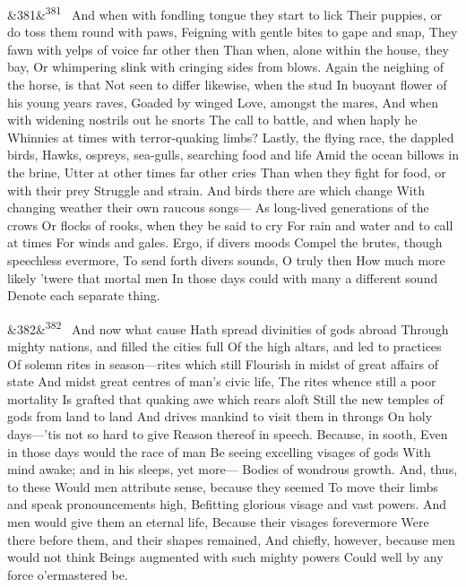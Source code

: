 \documentclass[12pt]{article}
\newcommand{\para}[1][]{\par\noindent\ifx&#1&\else\textsuperscript{\footnotesize #1}~\fi}
\begin{document}
\para[381] And when with fondling tongue they start to lick Their puppies, or do toss them round with paws, Feigning with gentle bites to gape and snap, They fawn with yelps of voice far other then Than when, alone within the house, they bay, Or whimpering slink with cringing sides from blows. Again the neighing of the horse, is that Not seen to differ likewise, when the stud In buoyant flower of his young years raves, Goaded by winged Love, amongst the mares, And when with widening nostrils out he snorts The call to battle, and when haply he Whinnies at times with terror-quaking limbs? Lastly, the flying race, the dappled birds, Hawks, ospreys, sea-gulls, searching food and life Amid the ocean billows in the brine, Utter at other times far other cries Than when they fight for food, or with their prey Struggle and strain. And birds there are which change With changing weather their own raucous songs--- As long-lived generations of the crows Or flocks of rooks, when they be said to cry For rain and water and to call at times For winds and gales. Ergo, if divers moods Compel the brutes, though speechless evermore, To send forth divers sounds, O truly then How much more likely 'twere that mortal men In those days could with many a different sound Denote each separate thing.

\para[382] And now what cause Hath spread divinities of gods abroad Through mighty nations, and filled the cities full Of the high altars, and led to practices Of solemn rites in season---rites which still Flourish in midst of great affairs of state And midst great centres of man's civic life, The rites whence still a poor mortality Is grafted that quaking awe which rears aloft Still the new temples of gods from land to land And drives mankind to visit them in throngs On holy days---'tis not so hard to give Reason thereof in speech. Because, in sooth, Even in those days would the race of man Be seeing excelling visages of gods With mind awake; and in his sleeps, yet more--- Bodies of wondrous growth. And, thus, to these Would men attribute sense, because they seemed To move their limbs and speak pronouncements high, Befitting glorious visage and vast powers. And men would give them an eternal life, Because their visages forevermore Were there before them, and their shapes remained, And chiefly, however, because men would not think Beings augmented with such mighty powers Could well by any force o'ermastered be.
\end{document}
